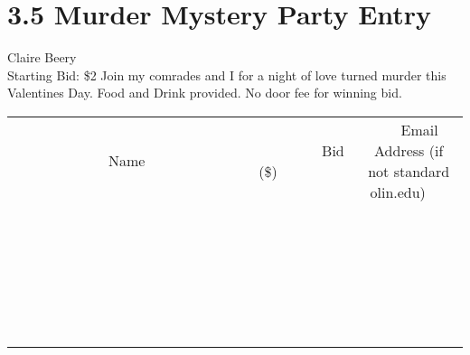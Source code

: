 \documentclass[11pt]{article}
\begin{document}
\section*{3.5 Murder Mystery Party Entry}
Claire Beery
\\
Starting Bid: \$2
\newline
Join my comrades and I for a night of love turned murder this Valentines Day. Food and Drink provided. No door fee for winning bid.
\\[6ex]
\begin{tabular}{c c c}
~~~~~~~~~~~~~Name~~~~~~~~~~~~~ & ~~~~~~~~~Bid (\$)~~~~~~~~~  & ~~~Email Address (if not standard olin.edu)~~~\\
 & & \\
\hline
 & & \\
\hline
 & & \\
\hline
 & & \\
\hline
 & & \\
\hline
 & & \\
\hline
 & & \\
\hline
 & & \\
\hline
 & & \\
\hline
 & & \\
\hline
 & & \\
\hline
 & & \\
\hline
 & & \\
\hline
 & & \\
\hline
 & & \\
\hline
 & & \\
\hline
 & & \\
\hline
 & & \\
\hline
 & & \\
\hline
 & & \\
\hline
 & & \\
\hline
 & & \\
\hline
 & & \\
\hline
 & & \\
\hline
 & & \\
\hline
 & & \\
\hline
\end{tabular}
\newpage
\end{document}
